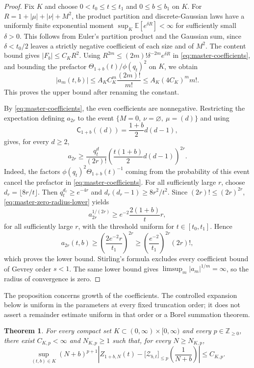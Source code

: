 \documentclass[11pt,a4paper,reqno]{article}
\newtheorem{theorem}{Theorem}[section]
\theoremstyle{definition}
\theoremstyle{remark}
\newcommand\Z{{\mathbb Z}}
\newcommand\E{{\mathbb E}}
\newcommand\cA{{\mathsf C}}
\begin{document}
\begin{proof}
Fix $K$ and choose $0<t_0\leq t\leq t_1$ and $0\leq b\leq b_1$ on $K$.  For $R=1+|\mu|+|\nu|+M^2$, the product partition and discrete-Gaussian laws have a uniformly finite exponential moment $\sup_K\E[e^{\delta R}]<\infty$ for sufficiently small $\delta>0$.  This follows from Euler's partition product and the Gaussian sum, since $\delta<t_0/2$ leaves a strictly negative coefficient of each size and of $M^2$.  The content bound gives $|F_b|\leq C_K R^2$.  Using $R^{2m}\leq(2m)!\delta^{-2m}e^{\delta R}$ in \eqref{eq:master-coefficients}, and bounding the prefactor $\Theta_{1+b}(t)/\phi(q_t)^2$ on $K$, we obtain
\[
|a_m(t,b)|\leq A_K C_K^m\frac{(2m)!}{m!} \leq A_K(4C_K)^m m!.
\]
This proves the upper bound after renaming the constant.

By \eqref{eq:master-coefficients}, the even coefficients are nonnegative.  Restricting the expectation defining $a_{2r}$ to the event $\{M=0,\ \nu=\varnothing,\ \mu=(d)\}$ and using
\[
\cA_{1+b}((d))=\frac{1+b}{2}d(d-1),
\]
gives, for every $d\geq2$,
\begin{equation}\label{eq:master-zero-radius-lower}
a_{2r}\geq \frac{q_t^d}{(2r)!} \left(\frac{t(1+b)}{2}d(d-1)\right)^{2r}.
\end{equation}
Indeed, the factors $\phi(q_t)^2\Theta_{1+b}(t)^{-1}$ coming from the probability of this event cancel the prefactor in \eqref{eq:master-coefficients}.  For all sufficiently large $r$, choose $d_r=\lfloor 8r/t\rfloor$.  Then $q_t^{d_r}\geq e^{-4r}$ and $d_r(d_r-1)\geq 8r^2/t^2$.  Since $(2r)!\leq(2r)^{2r}$, \eqref{eq:master-zero-radius-lower} yields
\[
a_{2r}^{1/(2r)} \geq e^{-2}\frac{2(1+b)}{t} r,
\]
for all sufficiently large $r$, with the threshold uniform for $t\in[t_0,t_1]$.  Hence
\[
a_{2r}(t,b)\geq\left(\frac{2e^{-2}r}{t_1}\right)^{2r} \geq\left(\frac{e^{-2}}{t_1}\right)^{2r}(2r)!,
\]
which proves the lower bound.  Stirling's formula excludes every coefficient bound of Gevrey order $s<1$.  The same lower bound gives $\limsup_m|a_m|^{1/m}=\infty$, so the radius of convergence is zero.
\end{proof}

The proposition concerns growth of the coefficients.  The controlled expansion below is uniform in the parameters at every fixed truncation order; it does not assert a remainder estimate uniform in that order or a Borel summation theorem.

\begin{theorem}\label{thm:controlled-chiral-antichiral}
For every compact set $K\subset(0,\infty)\times[0,\infty)$ and every $p\in\Z_{\geq0}$, there exist $C_{K,p}<\infty$ and $N_{K,p}\geq1$ such that, for every $N\geq N_{K,p}$,
\begin{equation}\label{eq:controlled-master-uniform}
\sup_{(t,b)\in K} (N+b)^{p+1} \left| Z_{1+b,N}(t) -\bigl[\mathcal Z_{b,t}\bigr]_{\leq p}\left(\frac{1}{N+b}\right) \right| \leq C_{K,p}.
\end{equation}
\end{theorem}
\end{document}
